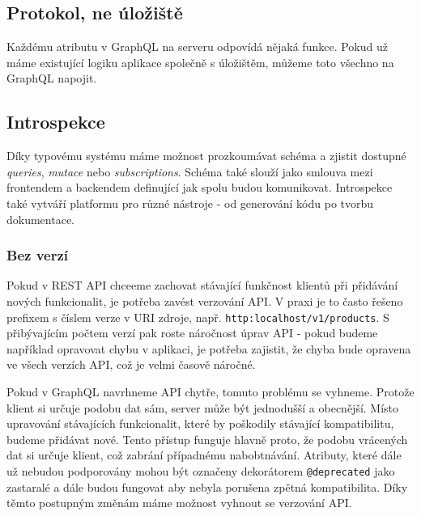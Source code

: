 \documentclass[thesis=M,czech]{FITthesis}[2019/12/23]
\begin{document}
\subsection*{Protokol, ne úložiště}
Každému atributu v GraphQL na serveru odpovídá nějaká funkce. Pokud už máme existující logiku aplikace společně s úložištěm, můžeme toto všechno na GraphQL napojit.

\subsection*{Introspekce}
Díky typovému systému máme možnost prozkoumávat schéma a zjistit dostupné \textit{queries}, \textit{mutace} nebo \textit{subscriptions}. Schéma také slouží jako smlouva mezi frontendem a backendem definující jak spolu budou komunikovat.
Introspekce také vytváří platformu pro různé nástroje - od generování kódu po tvorbu dokumentace.

\subsubsection*{Bez verzí}
Pokud v REST API chceeme zachovat stávající funkčnost klientů při přidávání nových funkcionalit, je potřeba zavést verzování API. V praxi je to často řešeno prefixem s číslem verze v URI zdroje, např. \texttt{http:localhost/v1/products}. S přibývajícím počtem verzí pak roste náročnost úprav API - pokud budeme například opravovat chybu v aplikaci, je potřeba zajistit, že chyba bude opravena ve všech verzích API, což je velmi časově náročné.

Pokud v GraphQL navrhneme API chytře, tomuto problému se vyhneme. Protože klient si určuje podobu dat sám, server může být jednodušší a obecnější. Místo upravování stávajících funkcionalit, které by poškodily stávající kompatibilitu, budeme přidávat nové. Tento přístup funguje hlavně proto, že podobu vrácených dat si určuje klient, což zabrání případnému nabobtnávání. Atributy, které dále už nebudou podporovány mohou být označeny dekorátorem \texttt{@deprecated} jako zastaralé a dále budou fungovat aby nebyla porušena zpětná kompatibilita. Díky těmto postupným změnám máme možnost vyhnout se verzování API.
\end{document}
